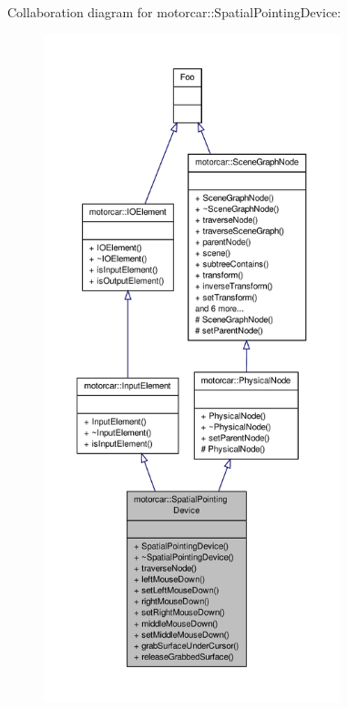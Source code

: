 Collaboration diagram for motorcar\-:\-:Spatial\-Pointing\-Device\-:
\nopagebreak
\begin{figure}[H]
\begin{center}
\leavevmode
\includegraphics[height=550pt]{classmotorcar_1_1SpatialPointingDevice__coll__graph}
\end{center}
\end{figure}
